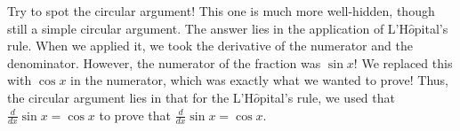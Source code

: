 Try to spot the circular argument! This one is much more well-hidden, though still a simple circular argument. The answer lies in the application of L'H$\hat{o}$pital's rule. When we applied it, we took the derivative of the numerator and the denominator. However, the numerator of the fraction was $\sin x$! We replaced this with $\cos x$ in the numerator, which was exactly what we wanted to prove! Thus, the circular argument lies in that for the L'H$\hat{o}$pital's rule, we used that $\frac{d}{dx}\sin x = \cos x$ to prove that $\frac{d}{dx}\sin x = \cos x$. 